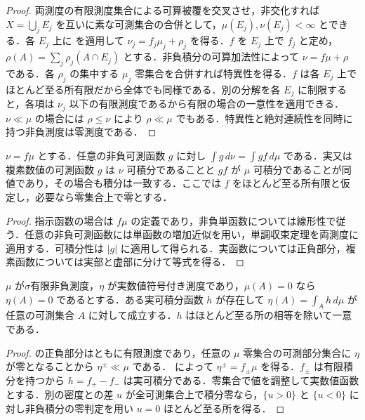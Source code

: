 \begin{proof}
両測度の有限測度集合による可算被覆を交叉させ，非交化すれば $X=\bigcup_j E_j$ を互いに素な可測集合の合併として，$\mu(E_j),\nu(E_j)<\infty$ とできる．各 $E_j$ 上に  を適用して $\nu_j=f_j\mu_j+\rho_j$ を得る．$f$ を $E_j$ 上で $f_j$ と定め，$\rho(A)=\sum_j\rho_j(A\cap E_j)$ とする．非負積分の可算加法性によって $\nu=f\mu+\rho$ である．各 $\rho_j$ の集中する $\mu_j$ 零集合を合併すれば特異性を得る．$f$ は各 $E_j$ 上でほとんど至る所有限だから全体でも同様である．別の分解を各 $E_j$ に制限すると，各項は $\nu_j$ 以下の有限測度であるから有限の場合の一意性を適用できる．$\nu\ll\mu$ の場合には $\rho\leq\nu$ により $\rho\ll\mu$ でもある．特異性と絶対連続性を同時に持つ非負測度は零測度である．
\end{proof}
\begin{prop}[密度による積分の変換]
$\nu=f\mu$ とする．任意の非負可測函数 $g$ に対し $\int g\,d\nu=\int gf\,d\mu$ である．実又は複素数値の可測函数 $g$ は $\nu$ 可積分であることと $gf$ が $\mu$ 可積分であることが同値であり，その場合も積分は一致する．ここでは $f$ をほとんど至る所有限と仮定し，必要なら零集合上で零とする．
\end{prop}
\begin{proof}
指示函数の場合は $f\mu$ の定義であり，非負単函数については線形性で従う．任意の非負可測函数には単函数の増加近似を用い，単調収束定理を両測度に適用する．可積分性は $|g|$ に適用して得られる．実函数については正負部分，複素函数については実部と虚部に分けて等式を得る．
\end{proof}
\begin{prop}
$\mu$ が$\sigma$有限非負測度，$\eta$ が実数値符号付き測度であり，$\mu(A)=0$ なら $\eta(A)=0$ であるとする．ある実可積分函数 $h$ が存在して $\eta(A)=\int_A h\,d\mu$ が任意の可測集合 $A$ に対して成立する．$h$ はほとんど至る所の相等を除いて一意である．
\end{prop}
\begin{proof}
 の正負部分はともに有限測度であり，任意の $\mu$ 零集合の可測部分集合に $\eta$ が零となることから $\eta^\pm\ll\mu$ である． によって $\eta^\pm=f_\pm\mu$ を得る．$f_\pm$ は有限積分を持つから $h=f_+-f_-$ は実可積分である．零集合で値を調整して実数値函数とする．別の密度との差 $u$ が全可測集合上で積分零なら，$\{u>0\}$ と $\{u<0\}$ に対し非負積分の零判定を用い $u=0$ ほとんど至る所を得る．
\end{proof}
